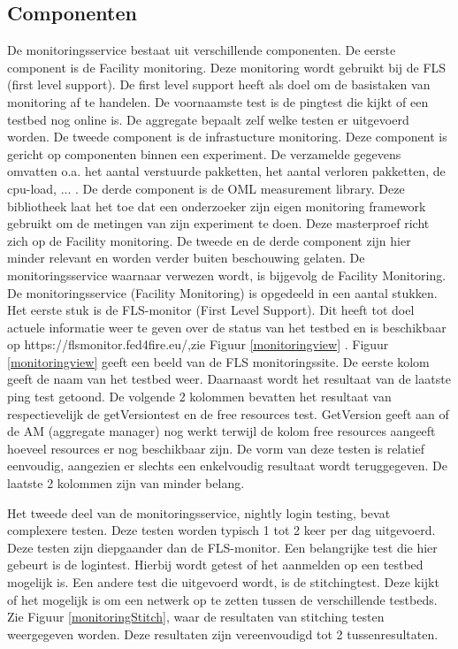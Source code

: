 \subsection{Componenten}
\npar
De monitoringsservice bestaat uit verschillende componenten. De eerste component is de Facility monitoring. Deze monitoring wordt gebruikt bij de FLS (first level support). De first level support heeft als doel om de basistaken van monitoring af te handelen. De voornaamste test is de pingtest die kijkt of een testbed nog online is. De aggregate bepaalt zelf welke testen er uitgevoerd worden.
\clearpage
\npar
De tweede component is de infrastucture monitoring. Deze component is gericht op componenten binnen een experiment. De verzamelde gegevens omvatten o.a. het aantal verstuurde pakketten, het aantal verloren pakketten, de cpu-load, ... .
\npar
De derde component is de OML measurement library. Deze bibliotheek laat het toe dat een onderzoeker zijn eigen monitoring framework gebruikt om de metingen van zijn experiment te doen.
\npar
Deze masterproef richt zich op de Facility monitoring. De tweede en de derde component zijn hier minder relevant en worden verder buiten beschouwing gelaten. De monitoringsservice waarnaar verwezen wordt, is bijgevolg de Facility Monitoring.
\npar
De monitoringsservice (Facility Monitoring) is opgedeeld in een aantal stukken. Het eerste stuk is de FLS-monitor (First Level Support). Dit heeft tot doel actuele informatie weer te geven over de status van het testbed en is beschikbaar op https://flsmonitor.fed4fire.eu/,zie  Figuur \ref{monitoringview} .
\npar
Figuur \ref{monitoringview} geeft een beeld van de FLS monitoringssite. De eerste kolom geeft de naam van het testbed weer. Daarnaast wordt het resultaat van de laatste ping test getoond. De volgende 2 kolommen bevatten het resultaat van respectievelijk de getVersiontest en de free resources test. GetVersion geeft aan of de AM (aggregate manager) nog werkt terwijl de kolom free resources aangeeft hoeveel resources er nog beschikbaar zijn. De vorm van deze testen is relatief eenvoudig, aangezien er slechts een enkelvoudig resultaat wordt teruggegeven. De laatste 2 kolommen zijn van minder belang.

\clearpage
\npar
Het tweede deel van de monitoringsservice, nightly login testing, bevat complexere testen. Deze testen worden typisch 1 tot 2 keer per dag uitgevoerd. Deze testen zijn diepgaander dan de FLS-monitor. Een belangrijke test die hier gebeurt is de logintest. Hierbij wordt getest of het aanmelden op een testbed mogelijk is. Een andere test die uitgevoerd wordt, is de stitchingtest. Deze kijkt of het mogelijk is om een netwerk op te zetten tussen de verschillende testbeds. Zie Figuur \ref{monitoringStitch}, waar de resultaten van stitching testen weergegeven worden. Deze resultaten zijn vereenvoudigd tot 2 tussenresultaten.

